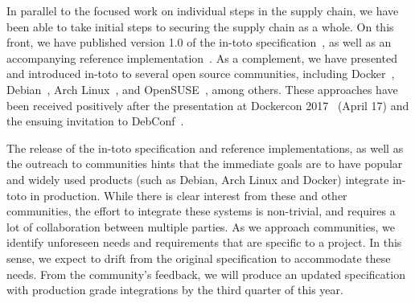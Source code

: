 
In parallel to the focused work on individual steps in the supply chain, we
have been able to take initial steps to securing the supply chain as a whole.
On this front, we have published version 1.0 of the in-toto specification~\cite{in-toto-spec}, as
well as an accompanying reference implementation~\cite{in-toto-impl}. As a complement, we have
presented and introduced in-toto to several open source communities, including
Docker~\cite{docker}, Debian~\cite{debian}, Arch Linux~\cite{archlinux}, and
OpenSUSE~\cite{opensuse}, among others. These approaches have been received
positively after the presentation at Dockercon 2017~\cite{dockercon2017, dockercon2017talk}
(April 17) and the ensuing invitation to DebConf~\cite{debconf2017}.





The release of the in-toto specification and reference implementations, as well
as the outreach to communities hints that the immediate goals are to have
popular and widely used products (such as Debian, Arch Linux and Docker) 
integrate in-toto in production. While there is clear interest from these and
other communities, the effort to integrate these systems is non-trivial, and
requires a lot of collaboration between multiple parties.  As we approach
communities, we identify unforeseen needs and requirements that are specific to a
project. In this sense, we expect to drift from the original specification to
accommodate these needs. From the community's feedback, we will produce an
updated specification with production grade integrations by the third quarter
of this year.


